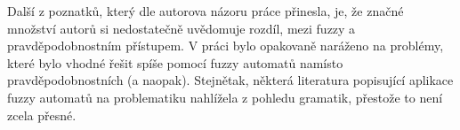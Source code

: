 Další z poznatků, který dle autorova názoru práce přinesla, je, že značné množství autorů si nedostatečně uvědomuje rozdíl, mezi fuzzy a pravděpodobnostním přístupem. V práci bylo opakovaně naráženo na problémy, které bylo vhodné řešit spíše pomocí fuzzy automatů namísto pravděpodobnostních (a naopak). Stejnětak, některá literatura popisující aplikace fuzzy automatů na problematiku nahlížela z pohledu gramatik, přestože to není zcela přesné.

% 
% 
% 
% 
% 
% 
% 
% 
% 
